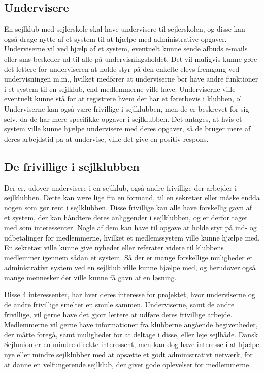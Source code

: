 \subsection{Undervisere}

En sejlklub med sejlerskole skal have undervisere til sejlerskolen, og disse kan også drage nytte af et system til
at hjælpe med administrative opgaver. Underviserne vil ved hjælp af et system, eventuelt kunne sende afbuds e-mails eller sms-beskeder ud til alle på
undervisningsholdet. Det vil muligvis kunne gøre det lettere for underviseren at holde styr på den enkelte elevs fremgang
ved undervisningen m.m., hvilket medfører at underviserne bør have andre funktioner i et system til en sejlklub, end medlemmerne
ville have. Underviserne ville eventuelt kunne stå for at registrere hvem der har et førerbevis i klubben, ol. Underviserne kan også
være frivillige i sejlklubben, men de er beskrevet for sig selv, da de har mere specifikke opgaver i sejlklubben. 
Det antages, at hvis et system ville kunne hjælpe undervisere med deres opgaver, så de bruger mere af deres arbejdstid på
at undervise, ville det give en positiv respons.

\subsection{De frivillige i sejlklubben}

Der er, udover undervisere i en sejlklub, også andre frivillige der arbejder i sejlklubben. Dette kan være lige fra en
formand, til en sekretær eller måske endda nogen som gør rent i sejlklubben. Disse frivillige kan alle have forskellig
gavn af et system, der kan håndtere deres anliggender i sejlklubben, og er derfor taget med som interessenter. Nogle af
dem kan have til opgave at holde styr på ind- og udbetalinger for medlemmerne, hvilket et medlemssystem ville kunne
hjælpe med. En sekretær ville kunne give nyheder eller referater videre til klubbens medlemmer igennem sådan et
system. Så der er mange forskellige muligheder et administrativt system ved en sejlklub ville kunne hjælpe med, og
herudover også mange mennesker der ville kunne få gavn af en løsning.


Disse 4 interessenter, har hver deres interesse for projektet, hvor underviserne og de andre frivillige smelter en smule
sammen. Underviserne, samt de andre frivillige, vil gerne have det gjort lettere at udføre deres frivillige arbejde.
Medlemmerne vil gerne have informationer fra klubberne angående begivenheder, der
måtte foregå, samt muligheder for at deltage i disse, eller leje sejlbåde.
Dansk Sejlunion er en mindre direkte interessent, men kan dog have interesse i at hjælpe nye eller mindre
sejlklubber med at opsætte et godt administrativt netværk, for at danne en velfungerende sejlklub, 
der giver gode oplevelser for medlemmerne.

